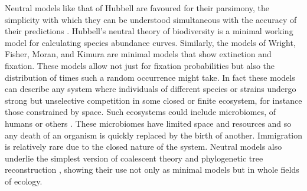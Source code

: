 Neutral models like that of Hubbell are favoured for their parsimony, the simplicity with which they can be understood simultaneous with the accuracy of their predictions \cite{Hubbell2001,Leibold2006,Rosindell2011}. 
Hubbell's neutral theory of biodiversity is a minimal working model for calculating species abundance curves. 
Similarly, the models of Wright, Fisher, Moran, and Kimura are minimal models that show extinction and fixation. 
%
These models allow not just for fixation probabilities but also the distribution of times such a random occurrence might take. %
In fact these models can describe any system where individuals of different species or strains undergo strong but unselective competition in some closed or finite ecosystem, for instance those constrained by space. %
Such ecosystems could include microbiomes, of humans \cite{Coburn2015,Kinross2011} or others \cite{Theriot2014,Wolfe2014,Roeselers2011,Ofiteru2010,Bucci2011,Vega2017}. %
These microbiomes have limited space and resources and so any death of an organism is quickly replaced by the birth of another. 
Immigration is relatively rare due to the closed nature of the system. 
Neutral models also underlie the simplest version of coalescent theory and phylogenetic tree reconstruction \cite{Kingman1982,Rice2004}, showing their use not only as minimal models but in whole fields of ecology. 

